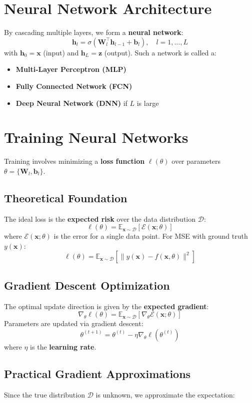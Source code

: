 \begin{notechapter}
\section{Neural Network Architecture}
By cascading multiple layers, we form a \textbf{neural network}:
\[
\mathbf{h}_l = \sigma(\mathbf{W}_l^\top \mathbf{h}_{l-1} + \mathbf{b}_l), \quad l = 1, \dots, L
\]
with $\mathbf{h}_0 = \mathbf{x}$ (input) and $\mathbf{h}_L = \mathbf{z}$ (output). Such a network is called a:
\begin{itemize}
    \item \textbf{Multi-Layer Perceptron (MLP)}
    \item \textbf{Fully Connected Network (FCN)}
    \item \textbf{Deep Neural Network (DNN)} if $L$ is large
\end{itemize}

\section{Training Neural Networks}
Training involves minimizing a \textbf{loss function} $\ell(\theta)$ over parameters $\theta = \{\mathbf{W}_l, \mathbf{b}_l\}$.

\subsection{Theoretical Foundation}
The ideal loss is the \textbf{expected risk} over the data distribution $\mathcal{D}$:
\[
\ell(\theta) = \mathbb{E}_{\mathbf{x} \sim \mathcal{D}} \left[ \mathcal{E}(\mathbf{x}; \theta) \right]
\]
where $\mathcal{E}(\mathbf{x}; \theta)$ is the error for a single data point. For MSE with ground truth $y(\mathbf{x})$:
\[
\ell(\theta) = \mathbb{E}_{\mathbf{x} \sim \mathcal{D}} \left[ \| y(\mathbf{x}) - f(\mathbf{x}, \theta) \|^2 \right]
\]

\subsection{Gradient Descent Optimization}
The optimal update direction is given by the \textbf{expected gradient}:
\[
\nabla_\theta \ell(\theta) = \mathbb{E}_{\mathbf{x} \sim \mathcal{D}} \left[ \nabla_\theta \mathcal{E}(\mathbf{x}; \theta) \right]
\]
Parameters are updated via gradient descent:
\[
\theta^{(t+1)} = \theta^{(t)} - \eta \nabla_\theta \ell(\theta^{(t)})
\]
where $\eta$ is the \textbf{learning rate}.

\subsection{Practical Gradient Approximations}
Since the true distribution $\mathcal{D}$ is unknown, we approximate the expectation:


\end{notechapter}
